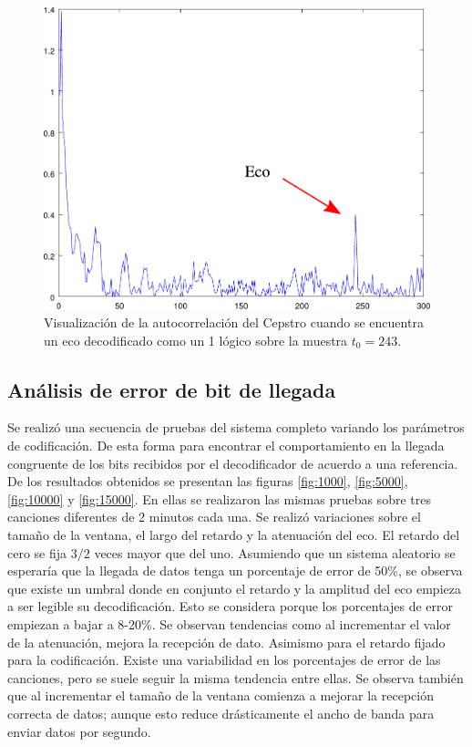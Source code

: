 \documentclass[conference]{IEEEtran}
\begin{document}
\begin{figure}
\centering
\includegraphics[scale=0.4]{rcc_0.pdf}
\caption{Visualización de la autocorrelación del Cepstro cuando se encuentra un eco decodificado como un 1 lógico sobre la muestra $t_0=243$.}
\label{fig:rcc0}
\end{figure}

\subsection{Análisis de error de bit de llegada}

Se realizó una secuencia de pruebas del sistema completo variando los parámetros de codificación. De esta forma para encontrar el comportamiento en la llegada congruente de los bits recibidos por el decodificador de acuerdo a una referencia. De los resultados obtenidos se presentan las figuras \ref{fig:1000}, \ref{fig:5000}, \ref{fig:10000} y \ref{fig:15000}. En ellas se realizaron las mismas pruebas sobre tres canciones diferentes de 2 minutos cada una. Se realizó variaciones sobre el tamaño de la ventana, el largo del retardo y la atenuación del eco. El retardo del cero se fija $3/2$ veces mayor que del uno. Asumiendo que un sistema aleatorio se esperaría que la llegada de datos tenga un porcentaje de error de 50\%, se observa que existe un umbral donde en conjunto el retardo y la amplitud del eco empieza a ser legible su decodificación. Esto se considera porque los porcentajes de error empiezan a bajar a 8-20\%. Se observan tendencias como al incrementar el valor de la atenuación, mejora la recepción de dato. Asimismo para el retardo fijado para la codificación. Existe una variabilidad en los porcentajes de error de las canciones, pero se suele seguir la misma tendencia entre ellas. Se observa también que al incrementar el tamaño de la ventana comienza a mejorar la recepción correcta de datos; aunque esto reduce drásticamente el ancho de banda para enviar datos por segundo.
\end{document}
